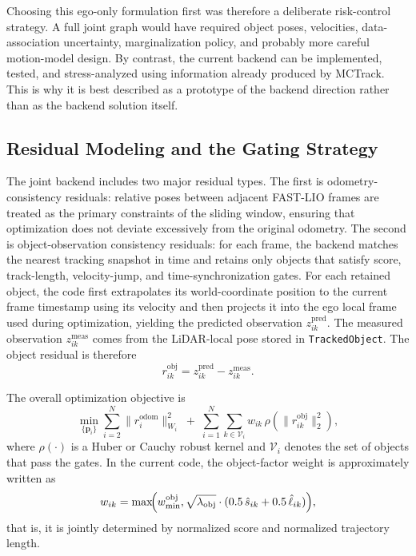 \documentclass[a4paper,12pt]{article}
\begin{document}
Choosing this ego-only formulation first was therefore a deliberate risk-control strategy. A full joint graph would have required object poses, velocities, data-association uncertainty, marginalization policy, and probably more careful motion-model design. By contrast, the current backend can be implemented, tested, and stress-analyzed using information already produced by MCTrack. This is why it is best described as a prototype of the backend direction rather than as the backend solution itself.

\subsection{Residual Modeling and the Gating Strategy}
The joint backend includes two major residual types. The first is odometry-consistency residuals: relative poses between adjacent FAST-LIO frames are treated as the primary constraints of the sliding window, ensuring that optimization does not deviate excessively from the original odometry. The second is object-observation consistency residuals: for each frame, the backend matches the nearest tracking snapshot in time and retains only objects that satisfy score, track-length, velocity-jump, and time-synchronization gates. For each retained object, the code first extrapolates its world-coordinate position to the current frame timestamp using its velocity and then projects it into the ego local frame used during optimization, yielding the predicted observation \(z^{\mathrm{pred}}_{ik}\). The measured observation \(z^{\mathrm{meas}}_{ik}\) comes from the LiDAR-local pose stored in \texttt{TrackedObject}. The object residual is therefore
\begin{equation}
r^{\mathrm{obj}}_{ik}=z^{\mathrm{pred}}_{ik}-z^{\mathrm{meas}}_{ik}.
\end{equation}

The overall optimization objective is
\begin{equation}
\min_{\{\mathbf{p}_i\}}
\sum_{i=2}^{N}\|r^{\mathrm{odom}}_i\|_{W_i}^2
\;+\;
\sum_{i=1}^{N}\sum_{k\in\mathcal{V}_i}
w_{ik}\,\rho\!\left(\|r^{\mathrm{obj}}_{ik}\|_2^2\right),
\end{equation}
where \(\rho(\cdot)\) is a Huber or Cauchy robust kernel and \(\mathcal{V}_i\) denotes the set of objects that pass the gates. In the current code, the object-factor weight is approximately written as
\begin{equation}
w_{ik}=
\max\!\Bigl(
w_{\min}^{\mathrm{obj}},
\sqrt{\lambda_{\mathrm{obj}}}\cdot
(0.5\,\hat{s}_{ik}+0.5\,\hat{\ell}_{ik})
\Bigr),
\end{equation}
that is, it is jointly determined by normalized score and normalized trajectory length.
\end{document}
